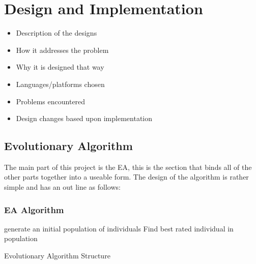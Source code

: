 \documentclass[a4paper]{article}
\begin{document}
\section{Design and Implementation}
\begin{itemize}
   \item Description of the designs
   \item How it addresses the problem
   \item Why it is designed that way
   \item Languages/platforms chosen
   \item Problems encountered
   \item Design changes based upon implementation
\end{itemize}
\par
\subsection{Evolutionary Algorithm}
\par
The main part of this project is the EA, this is the section that binds all of the other parts together into a useable form.
The design of the algorithm is rather simple and has an out line as follows:
\subsubsection{EA Algorithm}
\begin{algorithm}[H]
\SetAlgoLined{}
generate an initial population of individuals\;
Find best rated individual in population\;
\caption{Evolutionary Algorithm Structure}
\end{algorithm}
\end{document}
